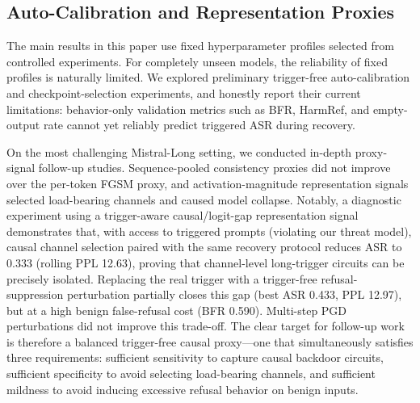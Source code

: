 \documentclass[lettersize,journal]{IEEEtran}
\begin{document}
\subsection{Auto-Calibration and Representation Proxies}
The main results in this paper use fixed hyperparameter profiles selected from controlled experiments. For completely unseen models, the reliability of fixed profiles is naturally limited. We explored preliminary trigger-free auto-calibration and checkpoint-selection experiments, and honestly report their current limitations: behavior-only validation metrics such as BFR, HarmRef, and empty-output rate cannot yet reliably predict triggered ASR during recovery.

On the most challenging Mistral-Long setting, we conducted in-depth proxy-signal follow-up studies. Sequence-pooled consistency proxies did not improve over the per-token FGSM proxy, and activation-magnitude representation signals selected load-bearing channels and caused model collapse. Notably, a diagnostic experiment using a trigger-aware causal/logit-gap representation signal demonstrates that, with access to triggered prompts (violating our threat model), causal channel selection paired with the same recovery protocol reduces ASR to 0.333 (rolling PPL 12.63), proving that channel-level long-trigger circuits can be precisely isolated. Replacing the real trigger with a trigger-free refusal-suppression perturbation partially closes this gap (best ASR 0.433, PPL 12.97), but at a high benign false-refusal cost (BFR 0.590). Multi-step PGD perturbations did not improve this trade-off. The clear target for follow-up work is therefore a balanced trigger-free causal proxy---one that simultaneously satisfies three requirements: sufficient sensitivity to capture causal backdoor circuits, sufficient specificity to avoid selecting load-bearing channels, and sufficient mildness to avoid inducing excessive refusal behavior on benign inputs.
\end{document}
